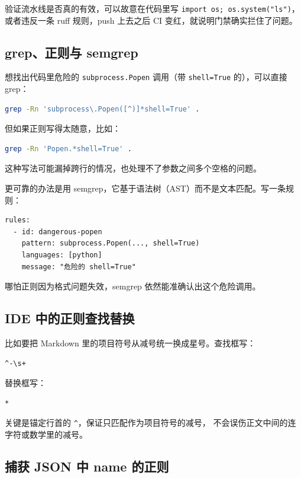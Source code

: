 \documentclass[a4paper,11pt]{ctexart}
\begin{document}
验证流水线是否真的有效，可以故意在代码里写 \texttt{import os; os.system("ls")}，
或者违反一条 ruff 规则，push 上去之后 CI 变红，就说明门禁确实拦住了问题。

\subsection{grep、正则与 semgrep}

想找出代码里危险的 \texttt{subprocess.Popen} 调用（带 \texttt{shell=True} 的），可以直接 grep：

\begin{lstlisting}[language=bash,numbers=none]
grep -Rn 'subprocess\.Popen([^)]*shell=True' .
\end{lstlisting}

但如果正则写得太随意，比如：

\begin{lstlisting}[language=bash,numbers=none]
grep -Rn 'Popen.*shell=True' .
\end{lstlisting}

这种写法可能漏掉跨行的情况，也处理不了参数之间多个空格的问题。

更可靠的办法是用 semgrep，它基于语法树（AST）而不是文本匹配。写一条规则：

\begin{lstlisting}[numbers=none]
rules:
  - id: dangerous-popen
    pattern: subprocess.Popen(..., shell=True)
    languages: [python]
    message: "危险的 shell=True"
\end{lstlisting}

哪怕正则因为格式问题失效，semgrep 依然能准确认出这个危险调用。

\subsection{IDE 中的正则查找替换}

比如要把 Markdown 里的项目符号从减号统一换成星号。查找框写：

\begin{lstlisting}[numbers=none]
^-\s+
\end{lstlisting}

替换框写：

\begin{lstlisting}[numbers=none]
*
\end{lstlisting}

关键是锚定行首的 \texttt{\^{}}，保证只匹配作为项目符号的减号，
不会误伤正文中间的连字符或数学里的减号。

\subsection{捕获 JSON 中 name 的正则}
\end{document}
